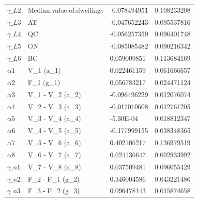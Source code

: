 \documentclass[a4paper,11pt]{article}
\begin{document}
\begin{table}[]
{\begin{tabular}{@{}llll@{}}
$\gamma\_L2$      & Median.value.of.dwellings                              & -0.078494951 & 0.108233208 \\
$\gamma\_L3$      & AT                                                                            & -0.047652243 & 0.095537816 \\
$\gamma\_L4$      & QC                                                                            & -0.056257359 & 0.096401748 \\
$\gamma\_L5$      & ON                                                                            & -0.085085482 & 0.090216342 \\
$\gamma\_L6$      & BC                                                                            & 0.059009851  & 0.113684169 \\
$\alpha1 $        & V\_1 (a\_1)                                                                   & 0.022461159  & 0.061666657 \\
$\alpha2$         & F\_1 (g\_1)                                                                   & 0.056783217  & 0.024471124 \\
$\alpha3$         & V\_1 - V\_2 (a\_2)                                                            & -0.096496229 & 0.012076074 \\
$\alpha4$         & V\_2 - V\_3 (a\_3)                                                            & -0.017010608 & 0.012761205 \\
$\alpha5$         & V\_3 - V\_4 (a\_4)                                                            & -5.30E-04    & 0.018812347 \\
$\alpha6$         & V\_4 - V\_5 (a\_5)                                                            & -0.177999155 & 0.038348365 \\
$\alpha7  $       & V\_5 - V\_6 (a\_6)                                                            & 0.402106217  & 0.136979519 \\
$\alpha8$         & V\_6 - V\_7 (a\_7)                                                            & 0.024136647  & 0.002933992 \\
$\gamma\_n1$      & V\_7 - V\_8 (a\_8)                                                            & 0.037509481  & 0.096055429 \\
$\gamma\_n2$      & F\_2 - F\_1 (g\_2)                                                            & 0.346004586  & 0.043221486 \\
$\gamma\_n3$      & F\_3 - F\_2 (g\_3)                                                            & 0.096478143  & 0.015874658 \\

\end{tabular}}
\end{table}
\end{document}
